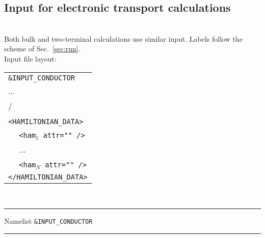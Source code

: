 \subsection{Input for electronic transport calculations}
\\
\noindent Both bulk and two-terminal calculations use similar input. 
Labels follow the scheme of Sec.~\ref{sec:run}.\\

\noindent Input file layout: \\

%
%
\begin{tabular}{l}
{\tt \&INPUT\_CONDUCTOR }\\
   ... \\
  / \\
  \\
{\tt <HAMILTONIAN\_DATA>} \\
  $\quad$ {\tt <ham$_1$   attr="" />} \\
  $\quad$ ...  \\
  $\quad$ {\tt <ham$_N$   attr="" />} \\
{\tt </HAMILTONIAN\_DATA>}
%
\end{tabular}
%
%
\\

\begin{centering}
\rule{2.2in}{0.01in} Namelist {\tt \&INPUT\_CONDUCTOR} \rule{2.2in}{0.01in}
\end{centering}\\

